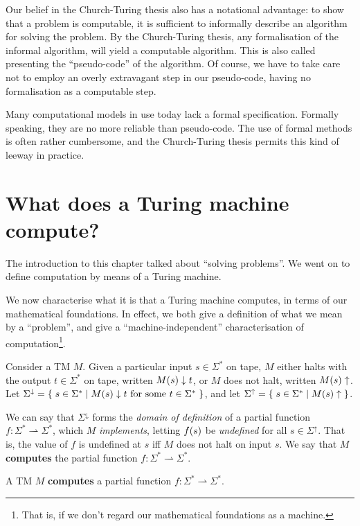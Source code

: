 Our belief in the Church-Turing thesis also has a notational advantage: to show
that a problem is computable, it is sufficient to informally describe an
algorithm for solving the problem. By the Church-Turing thesis, any
formalisation of the informal algorithm, will yield a computable algorithm.
This is also called presenting the ``pseudo-code'' of the algorithm. Of course,
we have to take care not to employ an overly extravagant step in our
pseudo-code, having no formalisation as a computable step.

Many computational models in use today lack a formal specification. Formally
speaking, they are no more reliable than pseudo-code. The use of formal methods
is often rather cumbersome, and the Church-Turing thesis permits this kind of
leeway in practice.

\section{What does a Turing machine compute?}\label{sec:background-what-tm-computes}

The introduction to this chapter talked about ``solving problems''. We went on
to define computation by means of a Turing machine.

We now characterise what it is that a Turing machine computes, in terms of our
mathematical foundations. In effect, we both give a definition of what we mean
by a ``problem'', and give a ``machine-independent'' characterisation of
computation\footnote{That is, if we don't regard our mathematical foundations
as a machine.}.

Consider a TM $M$. Given a particular input $s\in\Sigma^*$ on tape, $M$ either
halts with the output $t\in\Sigma^*$ on tape, written $M\mathopen{}\left({s}\right)\mathclose{}\downarrow t$, or
$M$ does not halt, written $M\mathopen{}\left({s}\right)\mathclose{}\uparrow$. Let
$\Sigma^\downarrow=\mathopen{}\left\{\mathrel{}{s\in\Sigma^* \mathrel{}\mid\mathrel{}{\text{$M\mathopen{}\left({s}\right)\mathclose{}\downarrow t$ for some
$t\in\Sigma^*$}} }\mathrel{}\right\}\mathclose{}$, and let
$\Sigma^\uparrow=\mathopen{}\left\{\mathrel{}{s\in\Sigma^*\mathrel{}\mid\mathrel{}{M\mathopen{}\left({s}\right)\mathclose{}\uparrow}}\mathrel{}\right\}\mathclose{}$.

We can say that $\Sigma^\downarrow$ forms the \emph{domain of definition} of a
partial function $f : \Sigma^* \rightharpoonup \Sigma^*$, which $M$
\emph{implements}, letting $f\mathopen{}\left({s}\right)\mathclose{}$ be \emph{undefined} for all $s\in
\Sigma^\uparrow$.  That is, the value of $f$ is undefined at $s$ iff $M$ does
not halt on input $s$. We say that $M$ \textbf{computes} the partial function
$f : \Sigma^* \rightharpoonup \Sigma^*$.

\begin{definition} A TM $M$ \textbf{computes} a partial function $f : \Sigma^*
\rightharpoonup \Sigma^*$. \end{definition}

